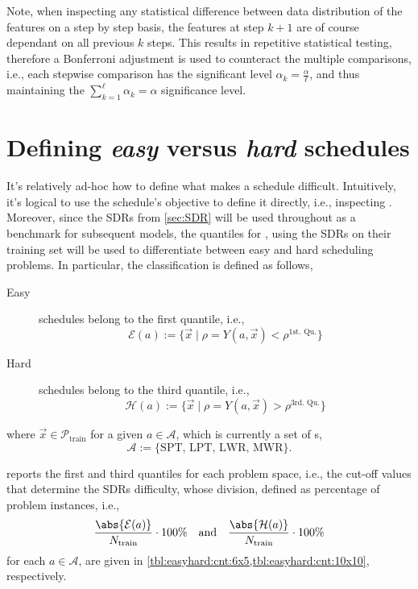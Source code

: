 Note, when inspecting any statistical difference between data distribution of the features on a step by step basis, the features at step $k+1$ are of course dependant on all previous $k$ steps. This results in repetitive statistical testing, therefore a Bonferroni adjustment is used to counteract the multiple comparisons, i.e., each stepwise comparison has the significant level $\alpha_k=\frac{\alpha}{\ell}$, and thus maintaining the $\sum_{k=1}^{\ell}\alpha_k=\alpha$ significance level.

\section{Defining \emph{easy} versus \emph{hard} schedules} 
\label{sec:diff:easyhard}
It's relatively ad-hoc how to define what makes a schedule difficult. Intuitively, it's logical to use the schedule's objective to define it directly, i.e., inspecting \fullnamerho. Moreover, since the SDRs from \cref{sec:SDR} will be used throughout as a benchmark for subsequent models, the quantiles for \namerho, using the SDRs on their training set will be used to differentiate between easy and hard scheduling problems. In particular, the classification is defined as follows, 
\begin{description}
	\item[Easy] schedules belong to the first quantile, i.e., \hfill \\
	\begin{equation}\label{eq:easy}
		\mathcal{E}(a):=\{\vec{x}\;|\;\rho=Y(a,\vec{x})<\rho^{\text{1st. Qu.}}\}
	\end{equation} 
	\item[Hard] schedules belong to the third quantile, i.e., \hfill \\
	\begin{equation}\label{eq:hard}
		\mathcal{H}(a):=\{\vec{x}\;|\;\rho=Y(a,\vec{x})>\rho^{\text{3rd. Qu.}}\}
	\end{equation} 
\end{description}
where $\vec{x}\in\mathcal{P}_{\text{train}}$ for a given $a\in\mathcal{A}$, 
which is currently a set of \sdr s,
\begin{equation}
\mathcal{A}:=\{\text{SPT,~LPT,~LWR,~MWR}\}.
\end{equation} 


 reports the first and third quantiles for each problem space, i.e., the cut-off values that determine the SDRs difficulty, whose division, defined as percentage of problem instances, i.e., 
\begin{equation}\label{eq:easyhard:cnt}
	\frac{\abs{\mathcal{E}(a)}}{N_{\text{train}}} \cdot 100\%
	\quad \text{and} \quad 
	\frac{\abs{\mathcal{H}(a)}}{N_{\text{train}}}\cdot 100\%
\end{equation}
for each $a\in\mathcal{A}$, are given in \cref{tbl:easyhard:cnt:6x5,tbl:easyhard:cnt:10x10}, respectively. 

